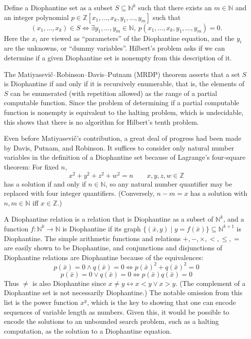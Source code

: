 \documentclass{llncs}
\newcommand{\N}{\mathbb{N}}
\newcommand{\Z}{\mathbb{Z}}
\begin{document}
Define a Diophantine set as a subset $S\subseteq \N^k$ such that there exists an $m\in\N$ and an integer polynomial $p\in\Z[x_1,\dots,x_k,y_1,\dots,y_m]$ such that
$$(x_1,\dots,x_k)\in S\iff \exists y_1,\dots,y_m\in\N,\ p(x_1,\dots,x_k,y_1,\dots,y_m)=0.$$
Here the $x_i$ are viewed as ``parameters'' of the Diophantine equation, and the $y_i$ are the unknowns, or ``dummy variables''. Hilbert's problem asks if we can determine if a given Diophantine set is nonempty from this description of it.

The Matiyasevi\v{c}--Robinson--Davis--Putnam (MRDP) theorem asserts that a set $S$ is Diophantine if and only if it is recursively enumerable, that is, the elements of $S$ can be enumerated (with repetition allowed) as the range of a partial computable function. Since the problem of determining if a partial computable function is nonempty is equivalent to the halting problem, which is undecidable, this shows that there is no algorithm for Hilbert's tenth problem.

Even before Matiyasevi\v{c}'s contribution, a great deal of progress had been made by Davis, Putnam, and Robinson. It suffices to consider only natural number variables in the definition of a Diophantine set because of Lagrange's four-square theorem: For fixed $n$,
$$x^2+y^2+z^2+w^2=n\qquad x,y,z,w\in\Z$$ 
has a solution if and only if $n\in\N$, so any natural number quantifier may be replaced with four integer quantifiers. (Conversely, $n-m=x$ has a solution with $n,m\in\N$ iff $x\in\Z$.)

A Diophantine relation is a relation that is Diophantine as a subset of $\N^k$, and a function $f:\N^k\to\N$ is Diophantine if its graph $\{(\bar x,y)\mid y=f(\bar x)\}\subseteq\N^{k+1}$ is Diophantine. The simple arithmetic functions and relations $+,-,\times,<,\le,=$ are easily shown to be Diophantine, and conjunctions and disjunctions of Diophantine relations are Diophantine because of the equivalences:
$$p(\bar x)=0\wedge q(\bar x)=0\iff p(\bar x)^2+q(\bar x)^2=0$$
$$p(\bar x)=0\lor q(\bar x)=0\iff p(\bar x)q(\bar x)=0$$
Thus $\ne$ is also Diophantine since $x\ne y\leftrightarrow x<y\lor x>y$. (The complement of a Diophantine set is not necessarily Diophantine.) The notable omission from this list is the power function $x^y$, which is the key to showing that one can encode sequences of variable length as numbers. Given this, it would be possible to encode the solutions to an unbounded search problem, such as a halting computation, as the solution to a Diophantine equation.
\end{document}
